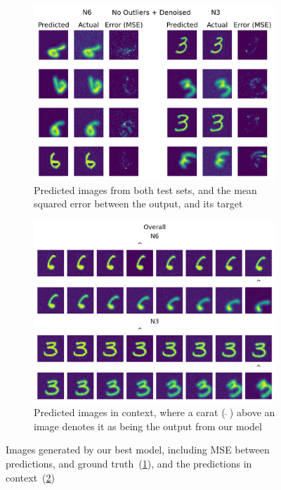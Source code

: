 \documentclass[twocolumn]{article}
\begin{document}
\begin{figure}
    \centering
    \begin{subfigure}{0.4\textwidth}
        \includegraphics[width=\textwidth]{assets/best-gen.png}
        \caption{Predicted images from both test sets, and the mean squared error between the output, and its target} 
        \label{fig:error}
    \end{subfigure}\hfill
    \begin{subfigure}{0.4\textwidth}
        \includegraphics[width=\textwidth]{assets/best-in-context.png}
        \caption{Predicted images in context, where a carat ($~\hat{}~$) above an image denotes it as being the output from our model} 
        \label{fig:in-context}
    \end{subfigure}
    \caption{Images generated by our best model, including MSE between predictions, and ground truth~(\ref{fig:error}), and the predictions in context~(\ref{fig:in-context}) }
    \label{fig:quali}
\end{figure}
\end{document}
